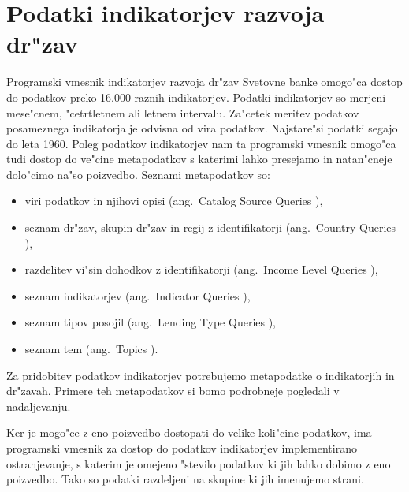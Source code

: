 \section{Podatki indikatorjev razvoja dr"zav}
\label{sec:podatki_ind_razvoja}



Programski vmesnik indikatorjev razvoja dr"zav Svetovne banke omogo"ca dostop
do podatkov preko 16.000 raznih indikatorjev. Podatki indikatorjev so merjeni
mese"cnem, "cetrtletnem ali letnem intervalu. Za"cetek meritev podatkov
posameznega indikatorja je odvisna od vira podatkov. Najstare"si podatki segajo
do leta 1960. Poleg podatkov indikatorjev nam ta programski vmesnik omogo"ca 
tudi dostop do ve"cine metapodatkov s katerimi lahko presejamo in natan"cneje
dolo"cimo na"so poizvedbo. Seznami metapodatkov so:
\begin{itemize}
\item viri podatkov in njihovi opisi (ang.\ Catalog Source Queries
	),
\item seznam dr"zav, skupin dr"zav in regij z identifikatorji (ang.\ Country Queries
	),
\item razdelitev vi"sin dohodkov z identifikatorji (ang.\ Income Level Queries
	),
\item seznam indikatorjev (ang.\ Indicator Queries
  ),
\item seznam tipov posojil (ang.\ Lending Type Queries
	),
\item seznam tem (ang.\ Topics ).
\end{itemize}

Za pridobitev podatkov indikatorjev potrebujemo metapodatke o indikatorjih in
dr"zavah. Primere teh metapodatkov si bomo podrobneje pogledali v nadaljevanju.

Ker je mogo"ce z eno poizvedbo dostopati do velike koli"cine podatkov, ima
programski vmesnik za dostop do podatkov indikatorjev implementirano
ostranjevanje, s katerim je omejeno "stevilo podatkov ki jih lahko dobimo z eno
poizvedbo. Tako so podatki razdeljeni na skupine ki jih imenujemo strani.

